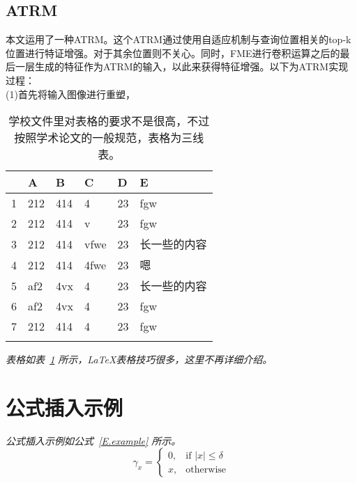 \subsection{ATRM}
本文运用了一种ATRM。这个ATRM通过使用自适应机制与查询位置相关的top-k位置进行特证增强。对于其余位置则不关心。同时，FME进行卷积运算之后的最后一层生成的特征作为ATRM的输入，以此来获得特征增强。以下为ATRM实现过程：\\
(1)首先将输入图像进行重塑，




\begin{table}[htb]
  \centering
  \caption{学校文件里对表格的要求不是很高，不过按照学术论文的一般规范，表格为三线表。}
  \label{T.example}
  \begin{tabular}{llllll}
  \hline
   & A  & B  & C  & D  & E \\
  \hline
1 	& 212 & 414 & 4 		& 23 & fgw	\\
2 	& 212 & 414 & v 		& 23 & fgw	\\
3 	& 212 & 414 & vfwe		& 23 & 长一些的内容	\\
4 	& 212 & 414 & 4fwe		& 23 & 嗯	\\
5 	& af2 & 4vx & 4 		& 23 & 长一些的内容	\\
6 	& af2 & 4vx & 4 		& 23 & fgw	\\
7 	& 212 & 414 & 4 		& 23 & fgw	\\

\hline{}
\end{tabular}
\end{table}

\emph{表格如表~\ref{T.example} 所示，\LaTeX 表格技巧很多，这里不再详细介绍。}

\lipsum

\newpage    %

\section{公式插入示例}

\lipsum

\emph{公式插入示例如公式~\eqref{E.example} 所示。}
\begin{equation}
\gamma_x=
\begin{cases}
  0, & \text{if $|x| \leq \delta$} \\
  x, & \text{otherwise}
\end{cases}
\label{E.example}
\end{equation}


\newpage    %

